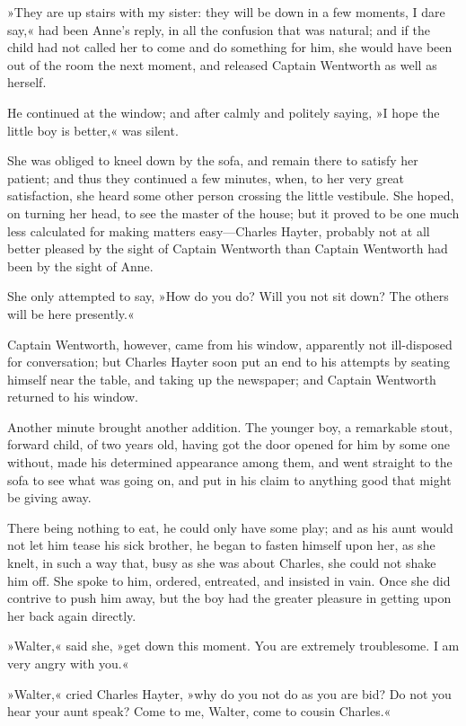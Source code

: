 »They are up stairs with my sister: they will be down in a few moments, I dare say,« had been Anne's reply, in all the confusion that was natural; and if the child had not called her to come and do something for him, she would have been out of the room the next moment, and released Captain Wentworth as well as herself.

He continued at the window; and after calmly and politely saying, »I hope the little boy is better,« was silent.

She was obliged to kneel down by the sofa, and remain there to satisfy her patient; and thus they continued a few minutes, when, to her very great satisfaction, she heard some other person crossing the little vestibule. She hoped, on turning her head, to see the master of the house; but it proved to be one much less calculated for making matters easy—Charles Hayter, probably not at all better pleased by the sight of Captain Wentworth than Captain Wentworth had been by the sight of Anne.

She only attempted to say, »How do you do? Will you not sit down? The others will be here presently.«

Captain Wentworth, however, came from his window, apparently not ill-disposed for conversation; but Charles Hayter soon put an end to his attempts by seating himself near the table, and taking up the newspaper; and Captain Wentworth returned to his window.

Another minute brought another addition. The younger boy, a remarkable stout, forward child, of two years old, having got the door opened for him by some one without, made his determined appearance among them, and went straight to the sofa to see what was going on, and put in his claim to anything good that might be giving away.

There being nothing to eat, he could only have some play; and as his aunt would not let him tease his sick brother, he began to fasten himself upon her, as she knelt, in such a way that, busy as she was about Charles, she could not shake him off. She spoke to him, ordered, entreated, and insisted in vain. Once she did contrive to push him away, but the boy had the greater pleasure in getting upon her back again directly.

»Walter,« said she, »get down this moment. You are extremely troublesome. I am very angry with you.«

»Walter,« cried Charles Hayter, »why do you not do as you are bid? Do not you hear your aunt speak? Come to me, Walter, come to cousin Charles.«

